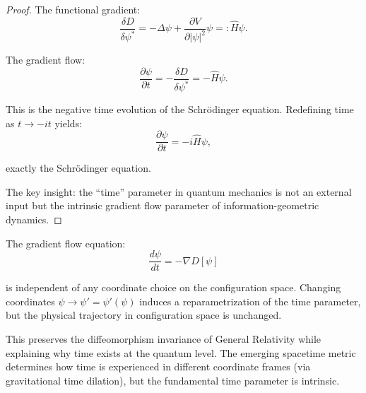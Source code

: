 \begin{theorem}
\begin{theorem}
\begin{proof}
The functional gradient:
\begin{equation}
\frac{\delta D}{\delta \psi^*} = -\Delta \psi + \frac{\partial V}{\partial |\psi|^2} \psi =: \hat{H} \psi.
\end{equation}

The gradient flow:
\begin{equation}
\frac{\partial \psi}{\partial t} = -\frac{\delta D}{\delta \psi^*} = -\hat{H} \psi.
\end{equation}

This is the negative time evolution of the Schrödinger equation. Redefining time as $t \to -it$ yields:
\begin{equation}
\frac{\partial \psi}{\partial t} = -i\hat{H}\psi,
\end{equation}

exactly the Schrödinger equation.

The key insight: the ``time'' parameter in quantum mechanics is not an external input but the intrinsic gradient flow parameter of information-geometric dynamics.

\end{proof}

\end{theorem}

\begin{remark}

The gradient flow equation:
\begin{equation}
\frac{d\psi}{dt} = -\nabla D[\psi]
\end{equation}

is independent of any coordinate choice on the configuration space. Changing coordinates $\psi \to \psi' = \psi'(\psi)$ induces a reparametrization of the time parameter, but the physical trajectory in configuration space is unchanged.

This preserves the diffeomorphism invariance of General Relativity while explaining why time exists at the quantum level. The emerging spacetime metric determines how time is experienced in different coordinate frames (via gravitational time dilation), but the fundamental time parameter is intrinsic.

\end{remark}

\end{theorem}


